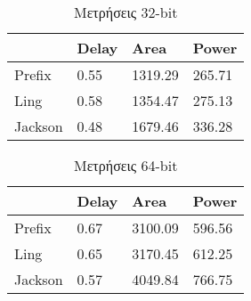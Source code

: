 \begin{multicols}{2}
\begin{table}[H]
\begin{tabular}{||p{1.2cm} | p{0.7cm} p{1cm} p{1cm} ||}
        \hline
        & Delay & Area & Power \\ [0.5ex] 
        \hline\hline
        Prefix  & 0.55  & 1319.29    & 265.71 \\ 
        \hline
        Ling    & 0.58  & 1354.47    & 275.13 \\
        \hline
        Jackson & 0.48  & 1679.46    & 336.28 \\
        \hline
    \end{tabular}
\caption{Μετρήσεις 32-bit}
\label{result_table_32}
\end{table}
\begin{table}[H]
\centering
     \begin{tabular}{||p{1.2cm} | p{0.7cm} p{1cm} p{1cm} ||} 
        \hline
         & Delay & Area & Power \\ [0.5ex] 
        \hline\hline
        Prefix  & 0.67  & 3100.09    & 596.56 \\ 
        \hline
        Ling    & 0.65  & 3170.45    & 612.25 \\
        \hline
        Jackson & 0.57  & 4049.84    & 766.75 \\
        \hline
    \end{tabular}
\caption{Μετρήσεις 64-bit}
\label{result_table_64}
\end{table}
\end{multicols}












